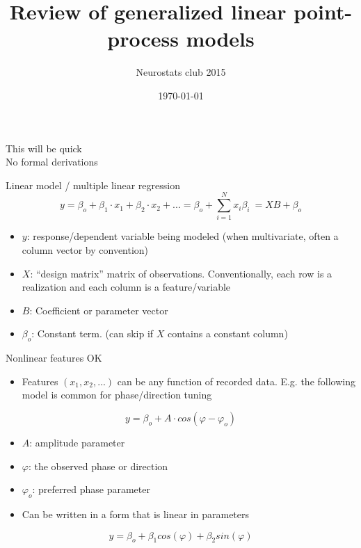 \documentclass[svgnames,13pt,handout]{beamer}
\DeclareRobustCommand{\emph}[1]{\textbf{{\color{emphasizecolor} #1}}}
\begin{document}
\title   {Review of generalized linear point-process models}
\author  {Neurostats club 2015}
\subtitle{}
\date    {\today}
\begin{frame} \titlepage \end{frame}
\begin{frame}{}
\begin{center}
	\large This will be quick\\
	No formal derivations
\end{center}
\end{frame} 


\begin{frame}{Linear model / multiple linear regression}
\[y = \beta_o + \beta_1 \cdot x_1 + \beta_2 \cdot x_2 + ... = \beta_o + \sum_{i=1}^N x_i \beta_i \ = XB + \beta_o\]
\begin{itemize}
	\item \emph{$y$}: response/dependent variable being modeled (when multivariate, often a column vector by convention)
	\item \emph{$X$}: ``design matrix'' matrix of observations. Conventionally, each row is a realization and each column is a feature/variable
	\item \emph{$B$}: Coefficient or parameter vector
	\item \emph{$\beta_o$}: Constant term. (can skip if $X$ contains a constant column)
\end{itemize}
\end{frame} 

\begin{frame}{Nonlinear features OK}
\begin{itemize}
	\item Features $(x_1,x_2,...)$ can be any function of recorded data. E.g. the following model is common for phase/direction tuning
	\end{itemize}
\[y = \beta_o + A\cdot cos(\varphi-\varphi_o)\]
\vspace{-2em}
\begin{itemize}
	\item <2->\emph{$A$}: amplitude parameter
	\item <3->\emph{$\varphi$}: the observed phase or direction
	\item <4->\emph{$\varphi_o$}: preferred phase parameter
	\item <5->Can be written in a form that is linear in parameters
	\end{itemize}
	\[y = \beta_o + \beta_1 cos(\varphi) + \beta_2 sin(\varphi)\]
\end{frame} 
\end{document}
